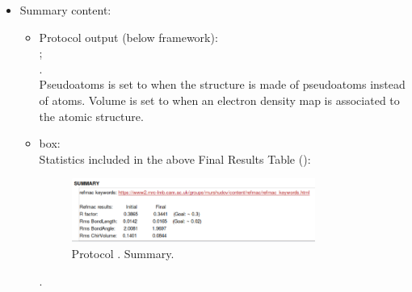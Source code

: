 \begin{itemize}
 \item Summary content:
  \begin{itemize}
     \item Protocol output (below \scipion framework):\\ ;\\ .\\Pseudoatoms is set to  when the structure is made of pseudoatoms instead of atoms. Volume is set to  when an electron density map is associated to the atomic structure.
     \item {} box:\\Statistics included in the above Final Results Table ():
     \begin{figure}[H]
         \centering 
         \captionsetup{width=.7\linewidth} 
         \includegraphics[width=0.80\textwidth]{Images_appendix/Fig138.pdf}
         \caption{Protocol . Summary.}
         \label{fig:app_protocol_refmac_13}
        \end{figure}.\\
    \end{itemize}

  \end{itemize}

    
